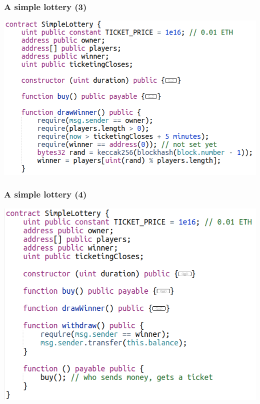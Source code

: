\documentclass[11pt]{beamer}  %
\begin{document}
\begin{frame}\frametitle{A simple lottery (3)}

  \begin{center}
    \includegraphics[scale=0.45,clip=false]{pictures/simple-lottery-3.png}
  \end{center}

\end{frame}

\begin{frame}\frametitle{A simple lottery (4)}

  \begin{center}
    \includegraphics[scale=0.45,clip=false]{pictures/simple-lottery-4.png}
  \end{center}

\end{frame}
\end{document}

